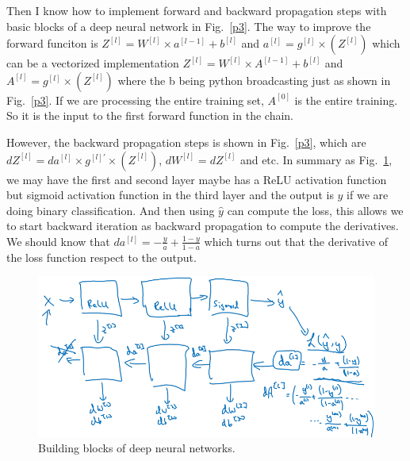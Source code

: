 \documentclass[a4paper]{article}
\begin{document}
Then I know how to implement forward and backward propagation steps with basic blocks of a deep neural network in Fig.~\ref{p3}. The way to improve the forward funciton is $Z^{[l]}=W^{[l]}\times a^{[l-1]}+b^{[l]}$ and $a^{[l]}=g^{[l]}\times (Z^{[l]})$ which can be a vectorized implementation $Z^{[l]}=W^{[l]}\times A^{[l-1]}+b^{[l]}$ and $A^{[l]}=g^{[l]}\times (Z^{[l]})$ where the b being python broadcasting just as shown in Fig.~\ref{p3}. If we are processing the entire training set, $A^{[0]}$ is the entire training. So it is the input to the first forward function in the chain.

However, the backward propagation steps is shown in Fig.~\ref{p3}, which are $dZ^{[l]}=da^{[l]}\times g^{[l]\prime}\times (Z^{[l]})$, $dW^{[l]}=dZ^{[l]}$ and etc. In summary as Fig.~\ref{p4}, we may have the first and second layer maybe has a ReLU activation function but sigmoid activation function in the third layer and the output is $\hat{y}$ if we are doing binary classification. And then using $\hat{y}$ can compute the loss, this allows we to start backward iteration as backward propagation to compute the derivatives. We should know that $da^{[l]}=-\frac{y}{a}+\frac{1-y}{1-a}$ which turns out that the derivative of the loss function respect to the output.

\begin{figure}[!b]
	\begin{center}
		\includegraphics[scale=0.3]{figures/5.png}
	\end{center}
	\caption{Building blocks of deep neural networks.}
	\label{p4}
\end{figure}
\end{document}
